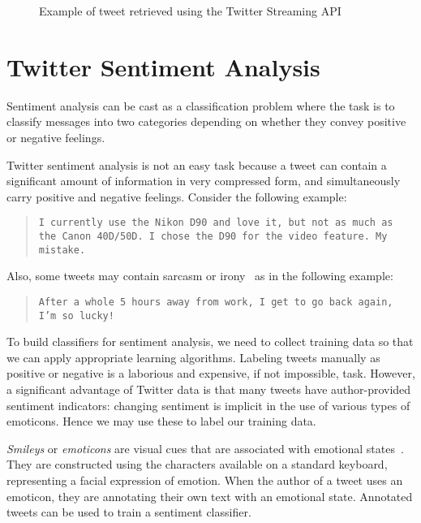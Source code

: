 \begin{figure}
\caption{Example of tweet retrieved using the Twitter Streaming API}
\label{fig:tweet}
\end{figure} 
\ENDOMIT 
\section{Twitter Sentiment Analysis}
\label{sec:sentiment}

Sentiment analysis can be cast as a classification problem where the
task is to classify messages into two categories depending on whether
they convey positive or negative feelings.%

Twitter sentiment analysis is not an easy task because a tweet can
contain a significant amount of information in very compressed form, and
simultaneously carry positive and negative feelings. Consider the
following example:
\begin{quote}
\texttt{I currently use the Nikon D90 and love it, but not as much as the Canon
40D/50D. I chose the D90 for the  video feature. My mistake.}
\end{quote} 
Also, some tweets may contain sarcasm or irony~\cite{carvalho} as in the following example:
\begin{quote}
\texttt{After a whole 5 hours away from work, I get to go back again, I'm so
lucky! }
\end{quote}
To build classifiers for sentiment analysis, we need to collect
training data so that we can apply appropriate learning algorithms.
Labeling tweets manually as positive or negative is a laborious and
expensive, if not impossible, task.  However, a significant advantage
of Twitter data is that many tweets have author-provided sentiment
indicators: changing sentiment is implicit in the use of various types
of emoticons. Hence we may use these to label our training data.  

{\em Smileys} or {\em emoticons} are visual cues that are associated
with emotional states~\cite{Read:05a,carvalho}.  They are constructed using the
characters available on a standard keyboard, representing a facial
expression of emotion. %
When the author of a tweet uses an emoticon, they are annotating their
own text with an emotional state. Annotated tweets can be used to
train a sentiment classifier.

